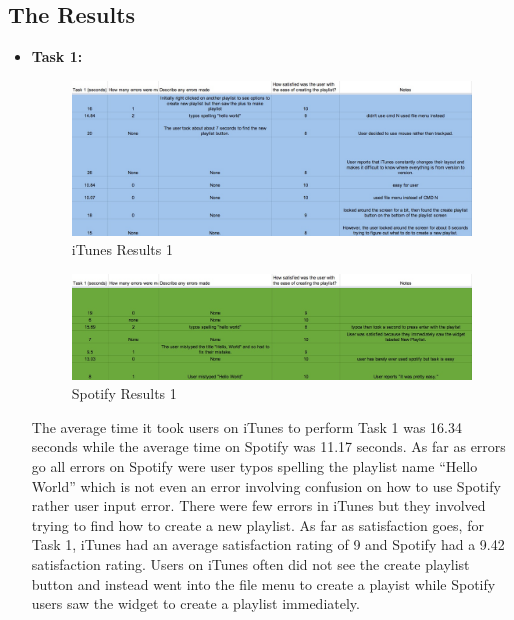 \documentclass[a4paper]{article}
\begin{document}
\subsection{The Results}
  \begin{itemize}
      \item \textbf{Task 1:}
      
          \begin{figure}[H]
              \centering
              \includegraphics[width=1\textwidth]{itunestask1_copy.jpg}
              \caption{\label{tasks: task1itunes}iTunes Results 1}
          \end{figure}
          \begin{figure}[H]
              \centering
              \includegraphics[width=1\textwidth]{spotifytask1_copy.jpg}
              \caption{\label{tasks: task1spotify}Spotify Results 1}
          \end{figure}
    
      The average time it took users on iTunes to perform Task 1 was 16.34 seconds while the average time on Spotify was 11.17 seconds. As far as errors go all errors on Spotify were user typos spelling the playlist name ``Hello World'' which is not even an error involving confusion on how to use Spotify rather user input error. There were few errors in iTunes but they involved trying to find how to create a new playlist. As far as satisfaction goes, for Task 1, iTunes had an average satisfaction rating of 9 and Spotify had a 9.42 satisfaction rating. Users on iTunes often did not see the create playlist button and instead went into the file menu to create a playist while Spotify users saw the widget to create a playlist immediately.\\
    

\end{itemize}
\end{document}
